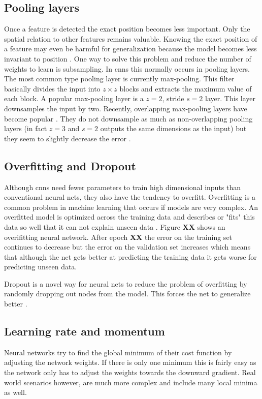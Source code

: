 \subsection*{Pooling layers}
Once a feature is detected the exact position becomes less important. Only the spatial relation to other features remains valuable. Knowing the exact position of a feature may even be harmful for generalization because the model becomes less invariant to position \cite{LeCun1998}. One way to solve this problem and reduce the number of weights to learn is subsampling. In \glspl{cnn} this normally occurs in pooling layers. The most common type pooling layer is currently max-pooling. This filter basically divides the input into $z\times z$ blocks and extracts the maximum value of each block. A popular max-pooling layer is a $z=2$, stride $s=2$ layer. This layer downsamples the input by two. Recently, overlapping max-pooling layers have become popular \cite{Szegedy2014}. They do not downsample as much as non-overlapping pooling layers {(in fact $z=3$ and $s=2$ outputs the same dimensions as the input)} but they seem to slightly decrease the error \cite{Krizhevsky2012}.

\subsection*{Overfitting and Dropout}
\label{subsec:overfittingDropout}
Although \glspl{cnn} need fewer parameters to train high dimensional inputs than conventional neural nets, they also have the tendency to overfitt. Overfitting is a common problem in machine learning that occurs if models are very complex. An overfitted model is optimized across the training data and describes or "fits" this data so well that it can not explain unseen data \cite{Falkenauer1998}. Figure \textbf{XX} shows an overifitting neural network. After epoch \textbf{XX} the error on the training set continues to decrease but the error on the validation set increases which means that although the net gets better at predicting the training data it gets worse for predicting unseen data.

Dropout is a novel way for neural nets to reduce the problem of overfitting by randomly dropping out nodes from the model. This forces the net to generalize better \cite{Srivastava2014}.

\subsection*{Learning rate and momentum}
\label{subsec:learningMomentum}
Neural networks try to find the global minimum of their cost function by adjusting the network weights. If there is only one minimum this is fairly easy as the network only has to adjust the weights towards the downward gradient. Real world scenarios however, are much more complex and include many local minima as well. 

